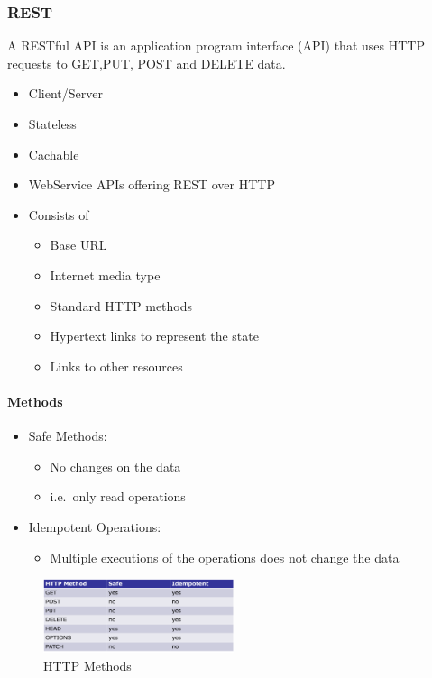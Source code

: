 \hypertarget{rest}{%
\subsubsection{REST}\label{rest}}
A RESTful API is an application program interface (API) that uses HTTP requests to GET,PUT, POST and DELETE data.
\begin{itemize}
\tightlist
\item
  Client/Server
\item
  Stateless
\item
  Cachable
\item
  WebService APIs offering REST over HTTP
\item
  Consists of

  \begin{itemize}
  \tightlist
  \item
    Base URL
  \item
    Internet media type
  \item
    Standard HTTP methods
  \item
    Hypertext links to represent the state
  \item
    Links to other resources
  \end{itemize}
\end{itemize}

\hypertarget{methods}{%
\paragraph{Methods}\label{methods}}

\begin{itemize}
\tightlist
\item
  Safe Methods:

  \begin{itemize}
  \tightlist
  \item
    No changes on the data
  \item
    i.e.~only read operations
  \end{itemize}
\item
  Idempotent Operations:

  \begin{itemize}
  \tightlist
  \item
    Multiple executions of the operations does not change the data
  \end{itemize}
\end{itemize}

\begin{figure}[H]
\centering
\includegraphics[width=0.5\textwidth]{figures/httpMethods.png}
\caption{HTTP Methods}
\end{figure}


